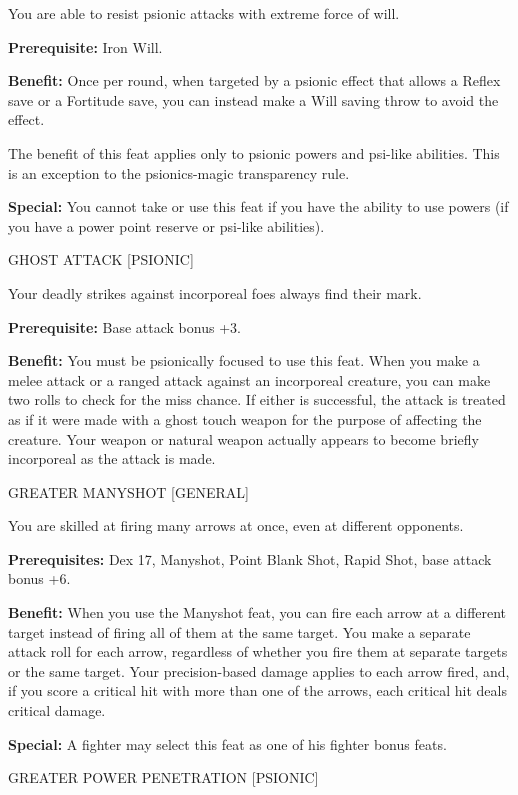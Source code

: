 \documentclass{article}
\begin{document}
You are able to resist psionic attacks with extreme force of will.

\textbf{Prerequisite:} Iron Will.

\textbf{Benefit:} Once per round, when targeted by a psionic effect that allows 
a Reflex save or a Fortitude save, you can instead make a Will saving throw to 
avoid the effect.

The benefit of this feat applies only to psionic powers and psi-like abilities. 
This is an exception to the psionics-magic transparency rule.

\textbf{Special:} You cannot take or use this feat if you have the ability to use 
powers (if you have a power point reserve or psi-like abilities).

\vspace{12pt}
GHOST ATTACK [PSIONIC]

Your deadly strikes against incorporeal foes always find their mark.

\textbf{Prerequisite:} Base attack bonus +3.

\textbf{Benefit:} You must be psionically focused to use this feat. When you make 
a melee attack or a ranged attack against an incorporeal creature, you can make 
two rolls to check for the miss chance. If either is successful, the attack is 
treated as if it were made with a ghost touch weapon for the purpose of affecting 
the creature. Your weapon or natural weapon actually appears to become briefly 
incorporeal as the attack is made.

\vspace{12pt}
GREATER MANYSHOT [GENERAL]

You are skilled at firing many arrows at once, even at different opponents.

\textbf{Prerequisites:} Dex 17, Manyshot, Point Blank Shot, Rapid Shot, base attack 
bonus +6.

\textbf{Benefit:} When you use the Manyshot feat, you can fire each arrow at a 
different target instead of firing all of them at the same target. You make a separate 
attack roll for each arrow, regardless of whether you fire them at separate targets 
or the same target. Your precision-based damage applies to each arrow fired, and, 
if you score a critical hit with more than one of the arrows, each critical hit 
deals critical damage.

\textbf{Special:} A fighter may select this feat as one of his fighter bonus feats.

\vspace{12pt}
GREATER POWER PENETRATION [PSIONIC]
\end{document}

